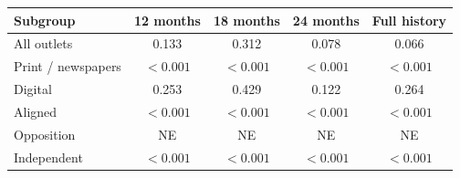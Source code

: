\begingroup\small
\setlength{\tabcolsep}{3pt}
\renewcommand{\arraystretch}{1.25}
\noindent%
\begin{tabular*}{\linewidth}{@{\extracolsep{\fill}}lcccc@{}}
\toprule
Subgroup & 12 months & 18 months & 24 months & Full history \\
\midrule
All outlets & 0.133 & 0.312 & 0.078 & 0.066 \\
Print / newspapers & $<0.001$ & $<0.001$ & $<0.001$ & $<0.001$ \\
Digital & 0.253 & 0.429 & 0.122 & 0.264 \\
Aligned & $<0.001$ & $<0.001$ & $<0.001$ & $<0.001$ \\
Opposition & NE & NE & NE & NE \\
Independent & $<0.001$ & $<0.001$ & $<0.001$ & $<0.001$ \\
\bottomrule
\end{tabular*}\par\endgroup
